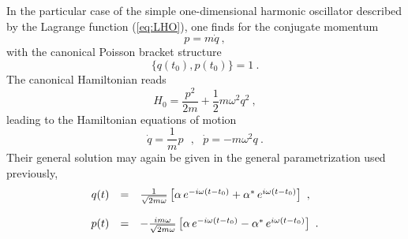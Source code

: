 \documentclass[a4paper,11pt]{article}
\begin{document}
In the particular case of the simple one-dimensional harmonic oscillator 
described by the Lagrange function (\ref{eq:LHO}), one finds for the 
conjugate momentum
\begin{equation}
p=m\dot{q}\ ,
\end{equation}
with the canonical Poisson bracket structure
\begin{equation}
\{q(t_0),p(t_0)\}=1\ .
\end{equation}
The canonical Hamiltonian reads
\begin{equation}
H_0=\frac{p^2}{2m}+\frac{1}{2}m\omega^2q^2\ ,
\end{equation}
leading to the Hamiltonian equations of motion
\begin{equation}
\dot{q}=\frac{1}{m}p\ \ \ ,\ \ \ 
\dot{p}=-m\omega^2q\ .
\end{equation}
Their general solution may again be given in the general parametrization
used previously,
\begin{equation}
\begin{array}{r c l}
q(t)&=&\frac{1}{\sqrt{2m\omega}}
\left[\alpha\,e^{-i\omega(t-t_0)}+\alpha^*\,e^{i\omega(t-t_0)}\right]\ ,\\
 & & \\
p(t)&=&-\frac{im\omega}{\sqrt{2m\omega}}
\left[\alpha\,e^{-i\omega(t-t_0)}-\alpha^*\,e^{i\omega(t-t_0)}\right]\ .
\end{array}
\label{eq:phasespacesolution}
\end{equation}
\end{document}
